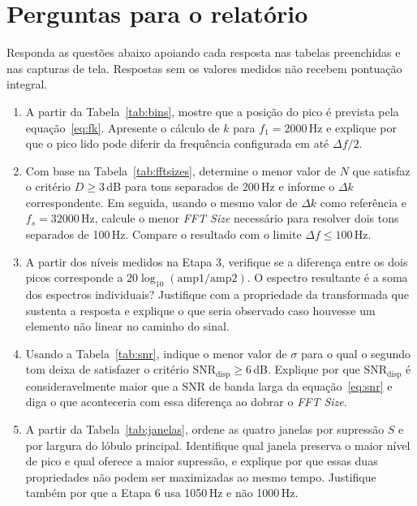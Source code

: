 \documentclass[11pt,a4paper]{article}
\begin{document}
\section{Perguntas para o relatório}

Responda as questões abaixo apoiando cada resposta nas tabelas preenchidas e
nas capturas de tela. Respostas sem os valores medidos não recebem pontuação
integral.

\begin{enumerate}[label=\textbf{Q\arabic*.}, leftmargin=*]

  \item A partir da Tabela~\ref{tab:bins}, mostre que a posição do pico é
    prevista pela equação~\eqref{eq:fk}. Apresente o cálculo de $k$ para
    $f_1 = 2000$\,Hz e explique por que o pico lido pode diferir da
    frequência configurada em até $\Delta f/2$.

  \item Com base na Tabela~\ref{tab:fftsizes}, determine o menor valor de
    $N$ que satisfaz o critério $D \geq 3$\,dB para tons separados de
    200\,Hz e informe o $\Delta k$ correspondente. Em seguida, usando o mesmo
    valor de $\Delta k$ como referência e $f_s = 32000$\,Hz, calcule o menor
    \textit{FFT Size} necessário para resolver dois tons separados de
    100\,Hz. Compare o resultado com o limite $\Delta f \leq 100$\,Hz.

  \item A partir dos níveis medidos na Etapa 3, verifique se a diferença
    entre os dois picos corresponde a $20\log_{10}(\mathrm{amp1}/\mathrm{amp2})$.
    O espectro resultante é a soma dos espectros individuais? Justifique com
    a propriedade da transformada que sustenta a resposta e explique o que
    seria observado caso houvesse um elemento não linear no caminho do sinal.

  \item Usando a Tabela~\ref{tab:snr}, indique o menor valor de $\sigma$ para
    o qual o segundo tom deixa de satisfazer o critério
    $\mathrm{SNR}_{\mathrm{disp}} \geq 6$\,dB. Explique por que
    $\mathrm{SNR}_{\mathrm{disp}}$ é consideravelmente maior que a SNR de
    banda larga da equação~\eqref{eq:snr} e diga o que aconteceria com essa
    diferença ao dobrar o \textit{FFT Size}.

  \item A partir da Tabela~\ref{tab:janelas}, ordene as quatro janelas por
    supressão $S$ e por largura do lóbulo principal. Identifique qual janela
    preserva o maior nível de pico e qual oferece a maior supressão, e
    explique por que essas duas propriedades não podem ser maximizadas ao
    mesmo tempo. Justifique também por que a Etapa 6 usa 1050\,Hz e não
    1000\,Hz.

\end{enumerate}
\end{document}
